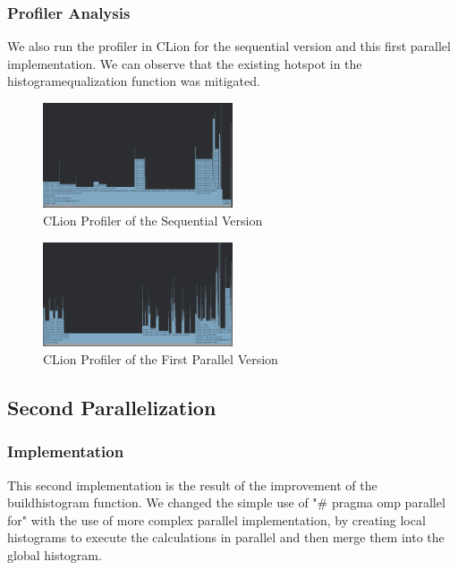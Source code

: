 \documentclass[sigconf]{acmart}
\begin{document}
\subsubsection{Profiler Analysis}
We also run the profiler in CLion for the sequential version and this first parallel implementation. We can observe that the existing hotspot in the histogram\textunderscore equalization function was mitigated. 
\begin{figure}[h]
    \centering
    \includegraphics[width=0.5\textwidth]{SequentialProfiler.png}
    \caption{CLion Profiler of the Sequential Version}
\end{figure}
\begin{figure}[h]
    \centering
    \includegraphics[width=0.5\textwidth]{InitialParallelProfiler.png}
    \caption{CLion Profiler of the First Parallel Version}
\end{figure}

\subsection{Second Parallelization}
\subsubsection{Implementation}
This second implementation is the result of the improvement of the build\textunderscore histogram function. We changed the simple use of "\# pragma omp parallel for" with the use of more complex parallel implementation, by creating local histograms to execute the calculations in parallel and then merge them into the global histogram.
\end{document}
